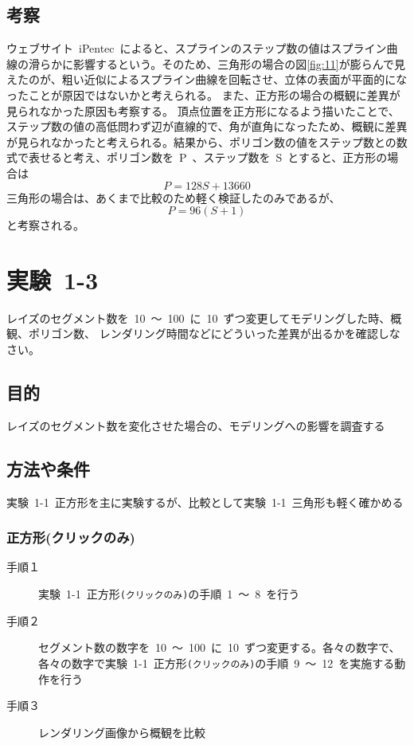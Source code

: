 \documentclass[a4j]{jarticle}
\begin{document}
\subsection{考察}
%
ウェブサイト\ iPentec\ によると、スプラインのステップ数の値はスプライン曲線の滑らかに影響するという\cite{toritchi}。そのため、三角形の場合の図\ref{fig:11}が膨らんで見えたのが、粗い近似によるスプライン曲線を回転させ、立体の表面が平面的になったことが原因ではないかと考えられる。
また、正方形の場合の概観に差異が見られなかった原因も考察する。
頂点位置を正方形になるよう描いたことで、ステップ数の値の高低問わず辺が直線的で、角が直角になったため、概観に差異が見られなかったと考えられる。結果から、ポリゴン数の値をステップ数との数式で表せると考え、ポリゴン数を\ P\ 、ステップ数を\ S\ とすると、正方形の場合は
\begin{equation}
  P = 128S + 13660
\end{equation}
三角形の場合は、あくまで比較のため軽く検証したのみであるが、
\begin{equation}
  P = 96(S + 1)
\end{equation}
と考察される。
%

\newpage
\section{実験\ 1-3}
レイズのセグメント数を\ 10\ ～\ 100\ に\ 10\ ずつ変更してモデリングした時、概観、ポリゴン数、
レンダリング時間などにどういった差異が出るかを確認しなさい。
\subsection{目的}
%
レイズのセグメント数を変化させた場合の、モデリングへの影響を調査する
%
\subsection{方法や条件}
%
実験\ 1-1\ 正方形を主に実験するが、比較として実験\ 1-1\ 三角形も軽く確かめる
\subsubsection{正方形(クリックのみ)}
\begin{description}
\item[手順１] 実験\ 1-1\ 正方形\verb|(クリックのみ)|の手順\ 1\ ～\ 8\ を行う
\item[手順２] セグメント数の数字を\ 10\ ～\ 100\ に\ 10\ ずつ変更する。各々の数字で、各々の数字で実験\ 1-1\ 正方形\verb|(クリックのみ)|の手順\ 9\ ～\ 12\ を実施する動作を行う
\item[手順３] レンダリング画像から概観を比較 
\end{description}
\end{document}
